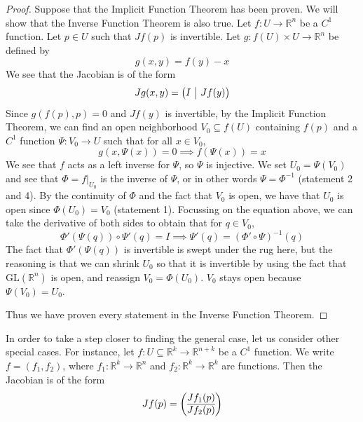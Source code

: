 \documentclass{article}
\newcommand{\GL}{\mathrm{GL}}
\theoremstyle{plain} %
\numberwithin{thm}{section} %
\theoremstyle{definition}
\begin{document}
    \begin{proof}
        Suppose that the Implicit Function Theorem has been proven. We will show that the Inverse Function Theorem is also true. Let \(f : U \to \mathbb{R}^n\) be a \(C^1\) function. Let \(p \in U\) such that \(Jf(p)\) is invertible. Let \(g: f(U) \times U \to \mathbb{R}^n\) be defined by
        \[
            g(x,y) = f(y) - x
        \]
        We see that the Jacobian is of the form
        \[
            J g(x,y) = \left( \begin{array}{@{}c|c@{}}
                I & Jf(y)
            \end{array} \right) 
        \]
        Since \(g(f(p), p) = 0\) and \(Jf(y)\) is invertible, by the Implicit Function Theorem, we can find an open neighborhood \(V_0 \subseteq f(U)\) containing \(f(p)\) and a \(C^1\) function \(\Psi : V_0 \to U\) such that for all \(x \in V_0\),
        \[
            g(x, \Psi (x)) = 0 \implies f(\Psi (x)) = x
        \]
        We see that \(f\) acts as a left inverse for \(\Psi\), so \(\Psi\) is injective. We set \(U_0 = \Psi (V_0)\) and see that \(\Phi  = f | _{U_0}\) is the inverse of \(\Psi\), or in other words \(\Psi = \Phi ^{-1}\) (statement 2 and 4). By the continuity of \(\Phi\) and the fact that \(V_0\) is open, we have that \(U_0\) is open since \(\Phi (U_0) = V_0\) (statement 1). Focussing on the equation above, we can take the derivative of both sides to obtain that for \(q \in V_0\),
        \[
            \Phi '(\Psi (q)) \circ \Psi '(q) = I \implies \Psi '(q) = (\Phi ' \circ \Psi)^{-1} (q) \tag{statement 3}
        \]
        The fact that \(\Phi '(\Psi (q))\) is invertible is swept under the rug here, but the reasoning is that we can shrink \(U_0\) so that it is invertible by using the fact that \(\GL (\mathbb{R}^n)\) is open, and reassign \(V_0 = \Phi (U_0)\). \(V_0\) stays open because \(\Psi (V_0) = U_0\).

        Thus we have proven every statement in the Inverse Function Theorem.
    \end{proof}
    In order to take a step closer to finding the general case, let us consider other special cases. For instance, let \(f: U \subseteq \mathbb{R}^k \to \mathbb{R}^{n+k}\) be a \(C^1\) function. We write \(f = (f_1, f_2)\), where \(f_1: \mathbb{R}^k \to \mathbb{R}^n\) and \(f_2: \mathbb{R}^k \to \mathbb{R}^k\) are functions. Then the Jacobian is of the form
    \[
        Jf(p) = \left( \begin{array}{@{}c@{}}
            Jf_1(p) \\
            \hline
            Jf_2(p) \\
        \end{array} \right) 
    \]
\end{document}

